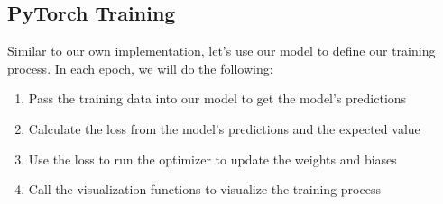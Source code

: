 \documentclass[11pt]{article}
\providecommand{\tightlist}{%
      \setlength{\itemsep}{0pt}\setlength{\parskip}{0pt}}
\begin{document}
    \subsection{PyTorch Training}\label{pytorch-training}

Similar to our own implementation, let's use our model to define our
training process. In each epoch, we will do the following:

\begin{enumerate}
\def\labelenumi{\arabic{enumi}.}
\tightlist
\item
  Pass the training data into our model to get the model's predictions
\item
  Calculate the loss from the model's predictions and the expected value
\item
  Use the loss to run the optimizer to update the weights and biases
\item
  Call the visualization functions to visualize the training process
\end{enumerate}
\end{document}
